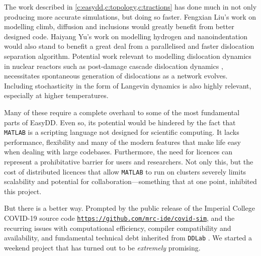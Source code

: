 The work described in \cref{c:easydd,c:topology,c:tractions} has done much in not only producing more accurate simulations, but doing so faster. Fengxian Liu's work on modelling climb, diffusion and inclusions would greatly benefit from better designed code. Haiyang Yu's work on modelling hydrogen \cite{YU2018} and nanoindentation would also stand to benefit a great deal from a parallelised and faster dislocation separation algorithm. Potential work relevant to modelling dislocation dynamics in nuclear reactors such as post-damage cascade dislocation dynamics \cite{sand2014radiation}, necessitates spontaneous generation of dislocations as a network evolves. Including stochasticity in the form of Langevin dynamics \cite{li2019diffusion} is also highly relevant, especially at higher temperatures.

Many of these require a complete overhaul to some of the most fundamental parts of EasyDD. Even so, its potential would be hindered by the fact that \texttt{MATLAB} is a scripting language not designed for scientific computing. It lacks performance, flexibility and many of the modern features that make life easy when dealing with large codebases. Furthermore, the need for licences can represent a prohibitative barrier for users and researchers. Not only this, but the cost of distributed licences that allow \texttt{MATLAB} to run on clusters severely limits scalability and potential for collaboration---something that at one point, inhibited this project.

But there is a better way. Prompted by the public release of the Imperial College COVID-19 source code \href{https://github.com/mrc-ide/covid-sim}{\texttt{https://github.com/mrc-ide/covid-sim}}, and the recurring issues with computational efficiency, compiler compatibility and availability, and fundamental technical debt inherited from \texttt{DDLab} \cite{ddlab}. We started a weekend project that has turned out to be \emph{extremely} promising.

